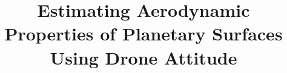 \documentclass[linenumbers]{aastex631}
\begin{document}
\title{Estimating Aerodynamic Properties of Planetary Surfaces Using Drone Attitude}


\end{document}
